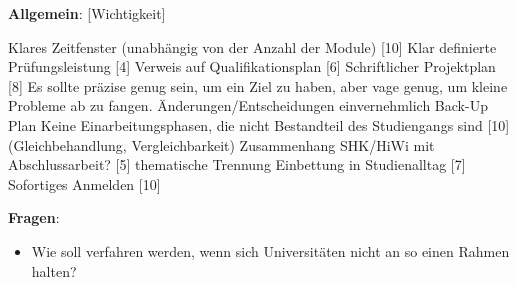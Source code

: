       \textbf{Allgemein}: [Wichtigkeit]
      \begin{outline}
        \1 Klares Zeitfenster (unabhängig von der Anzahl der Module) [10]
        \1 Klar definierte Prüfungsleistung [4]
        \1 Verweis auf Qualifikationsplan [6]
        \1 Schriftlicher Projektplan [8]
        \1 Es sollte präzise genug sein, um ein Ziel zu haben, aber vage genug, um kleine Probleme ab zu fangen.
        \1 Änderungen/Entscheidungen einvernehmlich
        \1 Back-Up Plan
        \1 Keine Einarbeitungsphasen, die nicht Bestandteil des Studiengangs sind [10] (Gleichbehandlung, Vergleichbarkeit)
        \1 Zusammenhang SHK/HiWi mit Abschlussarbeit? [5]
          \2 thematische Trennung
        \1 Einbettung in Studienalltag [7]
        \1 Sofortiges Anmelden [10]
      \end{outline}

      \textbf{Fragen}:
      \begin{itemize}
        \item Wie soll verfahren werden, wenn sich Universitäten nicht an so einen Rahmen halten?
      \end{itemize}
